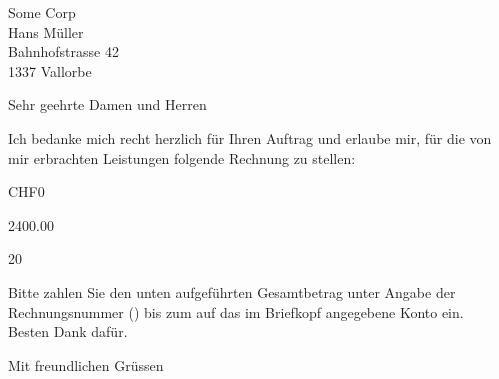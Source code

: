 \documentclass[DIN,SN,10pt,DIV=18,_rechnung]{scrlttr2}
\begin{document}
  \begin{letter}{
      Some Corp \\
      Hans Müller \\
      Bahnhofstrasse 42 \\
      1337 Vallorbe
    }

    \opening{Sehr geehrte Damen und Herren}

    Ich bedanke mich recht herzlich für Ihren Auftrag und erlaube mir, für die
    von mir erbrachten Leistungen folgende Rechnung zu stellen:

    \begin{invoice}{CHF}{0}

       {2400.00}
      \STExpenses

       {20}
    \end{invoice}

    \begin{samepage}
      Bitte zahlen Sie den unten aufgeführten Gesamtbetrag unter Angabe der
      Rechnungsnummer () bis zum  auf
      das im Briefkopf angegebene Konto ein.\\
      Besten Dank dafür.

      \closing{Mit freundlichen Grüssen}

    \end{samepage}
 \end{letter}
\end{document}
